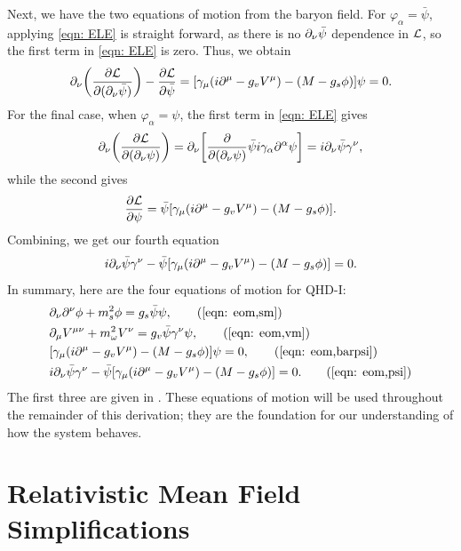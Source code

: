 Next, we have the two equations of motion from the baryon field. For $\varphi_\alpha = \bar\psi$, applying \eqref{eqn: ELE} is straight forward, as there is no $\partial_\nu \bar\psi$ dependence in $\mathcal{L}$, so the first term in \eqref{eqn: ELE} is zero. Thus, we obtain
\begin{align}\label{eqn: eom,barpsi}
    \p_\nu \pqty{\pdv{\Lag}{(\p_\nu \bar\psi)}}  - \pdv{\Lag}{\bar\psi} = \bqty{\gamma_\mu(i\p^\mu - g_v V^\mu) - (M-g_s\phi)} \psi = 0.
\end{align}
For the final case, when $\varphi_\alpha = \psi$, the first term in \eqref{eqn: ELE} gives
\begin{align*}
    \p_\nu \pqty{\pdv{\Lag}{(\p_\nu \psi)}} = \p_\nu\bqty{\pdv{}{(\p_\nu\psi)}\bar\psi i \gamma_\alpha \p^\alpha \psi} = i\p_\nu \bar\psi \gamma^\nu,
\end{align*}
while the second gives
\begin{align*}
    \pdv{\Lag}{\psi} = \bar\psi\bqty{\gamma_\mu(i\p^\mu - g_v V^\mu) - (M-g_s\phi)}.
\end{align*}
Combining, we get our fourth equation
\begin{align}\label{eqn: eom,psi}
    i \p_\nu \bar\psi \gamma^\nu -\bar\psi\bqty{\gamma_\mu(i\p^\mu - g_v V^\mu) - (M-g_s\phi)} = 0.
\end{align}
In summary, here are the four equations of motion for QHD-I:
\begin{align*}
    &\p_\nu \p^\nu \phi + m_s^2\phi = g_s\bar{\psi}\psi,\tag{\ref{eqn: eom,sm}}\\
    &\p_\mu V^{\mu\nu} + m_\omega^2 V^\nu = g_v \bar\psi \gamma^\nu \psi,\tag{\ref{eqn: eom,vm}}\\
    &\bqty{\gamma_\mu(i\p^\mu -g_v V^\mu) - (M-g_s\phi)} \psi = 0,\tag{\ref{eqn: eom,barpsi}}\\
    & i \p_\nu \bar\psi \gamma^\nu -\bar\psi\bqty{\gamma_\mu(i\p^\mu - g_v V^\mu) - (M-g_s\phi)} = 0. \tag{\ref{eqn: eom,psi}}
\end{align*}
The first three are given in \autocite{diener_2008}. These equations of motion will be used throughout the remainder of this derivation; they are the foundation for our understanding of how the system behaves.

\section{Relativistic Mean Field Simplifications}

